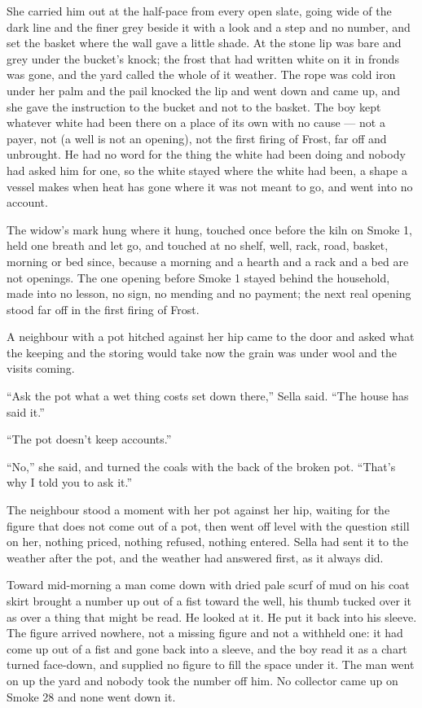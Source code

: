\scenebreak

She carried him out at the half-pace from every open slate, going wide of the dark line and the finer grey beside it with a look and a step and no number, and set the basket where the wall gave a little shade. At  the stone lip was bare and grey under the bucket's knock; the frost that had written white on it in fronds was gone, and the yard called the whole of it weather. The rope was cold iron under her palm and the pail knocked the lip and went down and came up, and she gave the instruction to the bucket and not to the basket. The boy kept whatever white had been there on a place of its own with no cause --- not a payer, not  (a well is not an opening), not the first firing of Frost, far off and unbrought. He had no  word for the thing the white had been doing and nobody had asked him for one, so the white stayed where the white had been, a shape a vessel makes when heat has gone where it was not meant to go, and went into no account.

The widow's mark hung where it hung, touched once before the kiln on Smoke 1, held one breath and let go, and touched at no shelf, well, rack, road, basket, morning or bed since, because a morning and a hearth and a rack and a bed are not openings. The one opening before Smoke 1 stayed behind the household, made into no lesson, no sign, no mending and no payment; the next real opening stood far off in the first firing of Frost.

A neighbour with a pot hitched against her hip came to the door and asked what the keeping and the storing would take now the grain was under wool and the visits coming.

“Ask the pot what a wet thing costs set down there,” Sella said. “The house has said it.”

“The pot doesn't keep accounts.”

“No,” she said, and turned the coals with the back of the broken pot. “That's why I told you to ask it.”

The neighbour stood a moment with her pot against her hip, waiting for the figure that does not come out of a pot, then went off level with the question still on her, nothing priced, nothing refused, nothing entered. Sella had sent it to the weather after the pot, and the weather had answered first, as it always did.

Toward mid-morning a man come down  with dried pale scurf of mud on his coat skirt brought a number up out of a fist toward the well, his thumb tucked over it as over a thing that might be read. He looked at it. He put it back into his sleeve. The figure arrived nowhere, not a missing figure and not a withheld one: it had come up out of a fist and gone back into a sleeve, and the boy read it as a chart turned face-down, and supplied no figure to fill the space under it. The man went on up the yard and nobody took the number off him. No collector came up  on Smoke 28 and none went down it.

